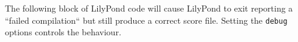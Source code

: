 \documentclass{scrartcl}
\begin{document}
The following block of LilyPond code will cause LilyPond to exit reporting
a “failed compilation“ but still produce a correct score file.  Setting the
\texttt{debug} options controls the behaviour.

\end{document}
